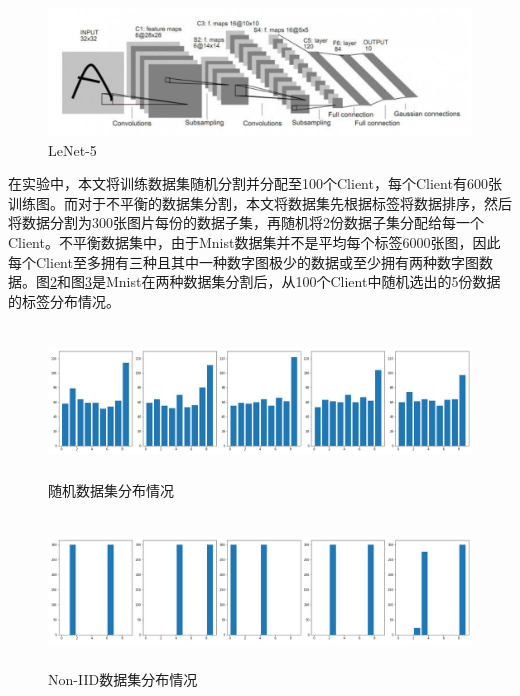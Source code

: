 \documentclass[zihao = -4,cn]{oucart}
\begin{document}
\begin{figure}[h]
	\centering %
	\includegraphics[scale=0.4]{assets/LeNet}
	\caption{LeNet-5}
	\label{fig:lenet}
\end{figure}

在实验中，本文将训练数据集随机分割并分配至100个Client，每个Client有600张训练图。而对于不平衡的数据集分割，本文将数据集先根据标签将数据排序，然后将数据分割为300张图片每份的数据子集，再随机将2份数据子集分配给每一个Client。不平衡数据集中，由于Mnist数据集并不是平均每个标签6000张图，因此每个Client至多拥有三种且其中一种数字图极少的数据或至少拥有两种数字图数据。图\ref{fig:random_data}和图\ref{fig:non-iid}是Mnist在两种数据集分割后，从100个Client中随机选出的5份数据的标签分布情况。\par
\begin{figure}[h]
	\centering %
	\includegraphics[width=15cm,height=4cm]{assets/random_data}
	\caption{随机数据集分布情况}
	\label{fig:random_data}
\end{figure}
\begin{figure}[h]
	\centering %
	\includegraphics[width=15cm,height=4cm]{assets/Non-IID}
	\caption{Non-IID数据集分布情况}
	\label{fig:non-iid}
\end{figure}
\end{document}
